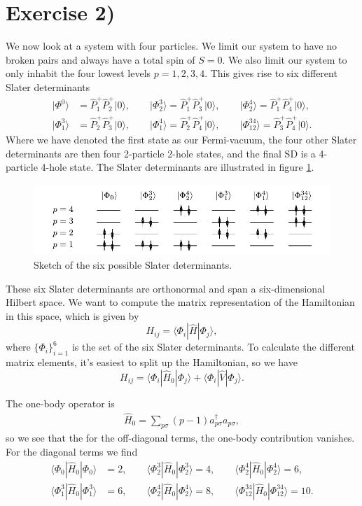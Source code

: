 \documentclass[a4paper, 11pt, notitlepage, english]{article}
\newcommand{\ket}[1]{|#1 \rangle}
\newcommand{\op}[1]{\hat{#1}}
\newcommand{\braopket}[3]{\langle #1 | {#2} | #3 \rangle}
\begin{document}
\clearpage

\section*{Exercise 2)}

We now look at a system with four particles. We limit our system to have no broken pairs and always have a total spin of $S=0$. We also limit our system to only inhabit the four lowest levels $p=1,2,3,4$.  This gives rise to six different Slater determinants
\begin{align*}
	\ket{\Phi^{0}} &= \op{P}_1^+ \op{P}_2^+ \ket{0}, \qquad \ket{\Phi_2^{3}} = \op{P}_1^+ \op{P}_3^+ \ket{0}, \qquad \ket{\Phi_2^{4}} = \op{P}_1^+ \op{P}_4^+ \ket{0}, \\
	\ket{\Phi_1^{3}} &= \op{P}_2^+ \op{P}_3^+ \ket{0}, \qquad \ket{\Phi_1^{4}} = \op{P}_2^+ \op{P}_4^+ \ket{0}, \qquad \ket{\Phi_{12}^{34}} = \op{P}_3^+ \op{P}_4^+ \ket{0}.
\end{align*}
Where we have denoted the first state as our Fermi-vacuum, the four other Slater determinants are then four 2-particle 2-hole states, and the final SD is a 4-particle 4-hole state. The Slater determinants are illustrated in figure \ref{fig:2}.

\begin{figure}[htpb]
	\includegraphics[width=\textwidth]{project2b.pdf}
	\caption{Sketch of the six possible Slater determinants. \label{fig:2}}
\end{figure}

These six Slater determinants are orthonormal and span a six-dimensional Hilbert space. We want to compute the matrix representation of the Hamiltonian in this space, which is given by
$$H_{ij} = \braopket{\Phi_i}{\op{H}}{\Phi_j},$$
where $\{\Phi_i\}_{i=1}^6$ is the set of the six Slater determinants. To calculate the different matrix elements, it's easiest to split up the Hamiltonian, so we have
$$H_{ij} = \braopket{\Phi_i}{\op{H}_0}{\Phi_j} + \braopket{\Phi_i}{\op{V}}{\Phi_j}. $$

The one-body operator is
\begin{align*}
\op{H}_0 = \sum_{p\sigma} (p-1)a_{p\sigma}^\dagger a_{p\sigma},
\end{align*}
so we see that the for the off-diagonal terms, the one-body contribution vanishes. For the diagonal terms we find
\begin{align*}
\braopket{\Phi_0}{\op{H}_0}{\Phi_0} &= 2, \qquad \braopket{\Phi_2^3}{\op{H}_0}{\Phi_2^3} = 4, \qquad \braopket{\Phi_2^{4}}{\op{H}_0}{\Phi_2^{4}} = 6, \\
\braopket{\Phi_1^3}{\op{H}_0}{\Phi_1^{3}} &= 6, \qquad \braopket{\Phi_2^{4}}{\op{H}_0}{\Phi_2^{4}} = 8, \qquad \braopket{\Phi_{12}^{34}}{\op{H}_0}{\Phi_{12}^{34}} = 10.
\end{align*}
\end{document}
